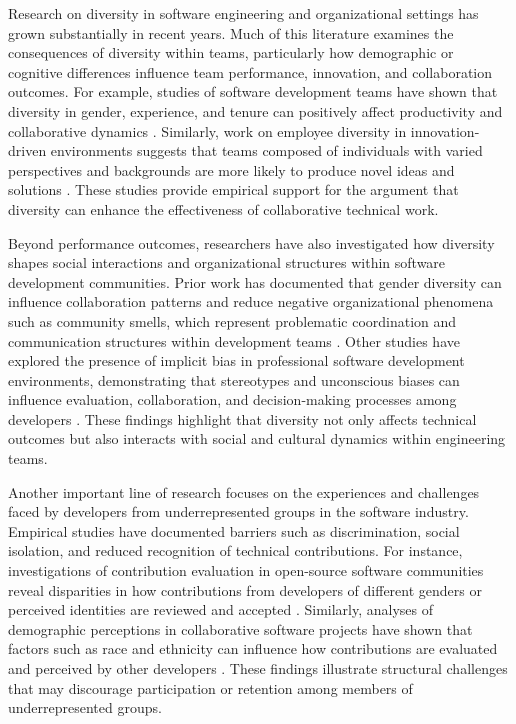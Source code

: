 Research on diversity in software engineering and organizational settings has grown substantially in recent years. Much of this literature examines the consequences of diversity within teams, particularly how demographic or cognitive differences influence team performance, innovation, and collaboration outcomes. For example, studies of software development teams have shown that diversity in gender, experience, and tenure can positively affect productivity and collaborative dynamics \cite{vasilescu2015gender}. Similarly, work on employee diversity in innovation-driven environments suggests that teams composed of individuals with varied perspectives and backgrounds are more likely to produce novel ideas and solutions \cite{ostergaard2011different}. These studies provide empirical support for the argument that diversity can enhance the effectiveness of collaborative technical work.

Beyond performance outcomes, researchers have also investigated how diversity shapes social interactions and organizational structures within software development communities. Prior work has documented that gender diversity can influence collaboration patterns and reduce negative organizational phenomena such as community smells, which represent problematic coordination and communication structures within development teams \cite{catolino2019gender}. Other studies have explored the presence of implicit bias in professional software development environments, demonstrating that stereotypes and unconscious biases can influence evaluation, collaboration, and decision-making processes among developers \cite{wang2019implicit}. These findings highlight that diversity not only affects technical outcomes but also interacts with social and cultural dynamics within engineering teams.

Another important line of research focuses on the experiences and challenges faced by developers from underrepresented groups in the software industry. Empirical studies have documented barriers such as discrimination, social isolation, and reduced recognition of technical contributions. For instance, investigations of contribution evaluation in open-source software communities reveal disparities in how contributions from developers of different genders or perceived identities are reviewed and accepted \cite{terrell2017gender}. Similarly, analyses of demographic perceptions in collaborative software projects have shown that factors such as race and ethnicity can influence how contributions are evaluated and perceived by other developers \cite{nadri2022relationship}. These findings illustrate structural challenges that may discourage participation or retention among members of underrepresented groups.

